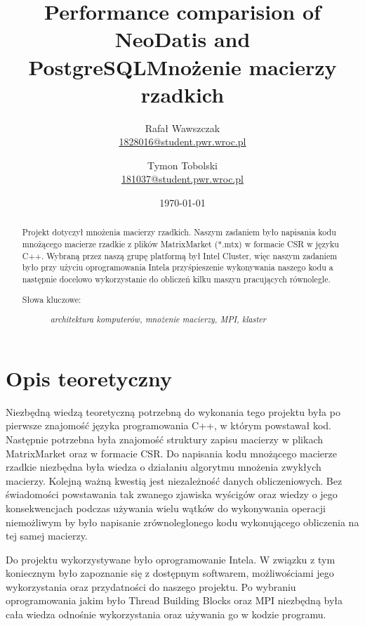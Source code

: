 \documentclass[a4paper,titlepage,12pt]{article}
\title{Performance comparision of NeoDatis and PostgreSQL}
\title{Mnożenie macierzy rzadkich}
\author{Rafał Wawszczak\\ \href{mailto:1828016@student.pwr.wroc.pl}{1828016@student.pwr.wroc.pl} \and Tymon Tobolski\\
\href{mailto:101037@student.pwr.wroc.pl}{181037@student.pwr.wroc.pl}}
\date{\today}
\begin{document}
\maketitle
\tableofcontents


\begin{abstract}
	Projekt dotyczył mnożenia macierzy rzadkich. Naszym zadaniem było napisania kodu mnożącego macierze rzadkie z plików MatrixMarket (*.mtx) w formacie CSR w języku C++. Wybraną przez naszą grupę platformą był Intel Cluster, więc naszym zadaniem było przy użyciu oprogramowania Intela przyśpieszenie wykonywania naszego kodu a następnie docelowo wykorzystanie do obliczeń kilku maszyn pracujących równolegle.

    {\begin{description} 
      \item[Słowa kluczowe:] \emph{architektura komputerów, mnożenie macierzy, MPI, klaster}
    \end{description}}
\end{abstract}



\section{Opis teoretyczny}
\label{sec:teoria}
Niezbędną wiedzą teoretyczną potrzebną do wykonania tego projektu była po pierwsze znajomość języka programowania C++, w którym powstawał kod. Następnie potrzebna była znajomość struktury zapisu macierzy w plikach MatrixMarket oraz w formacie CSR. Do napisania kodu mnożącego macierze rzadkie niezbędna była wiedza o działaniu algorytmu mnożenia zwykłych macierzy. Kolejną ważną kwestią jest niezależność danych obliczeniowych. Bez świadomości powstawania tak zwanego zjawiska wyścigów oraz wiedzy o jego konsekwencjach podczas używania wielu wątków do wykonywania operacji niemożliwym by było napisanie zrównoleglonego kodu wykonującego obliczenia na tej samej macierzy.

Do projektu wykorzystywane było oprogramowanie Intela. W związku z tym koniecznym było zapoznanie się z dostępnym softwarem, możliwościami jego wykorzystania oraz przydatności do naszego projektu. Po wybraniu oprogramowania jakim było Thread Building Blocks oraz MPI niezbędną była cała wiedza odnośnie wykorzystania oraz używania go w kodzie programu.
\end{document}
